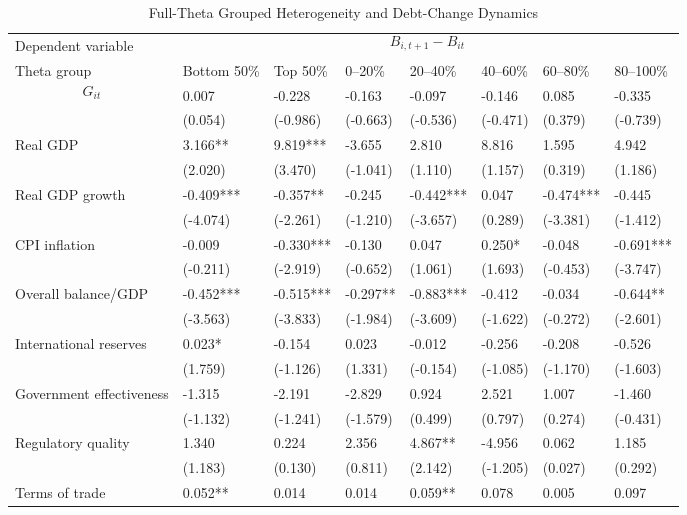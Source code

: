 \begin{table}[H]\centering
\begin{threeparttable}
\caption{Full-Theta Grouped Heterogeneity and Debt-Change Dynamics}
\label{tab:theta_group_heterogeneity_debt}
\scriptsize
\begin{tabularx}{\textwidth}{lYYYYYYY}
\toprule
Dependent variable &  \\
\cmidrule(lr){2-8}
Theta group & Bottom 50\% & Top 50\% & 0--20\% & 20--40\% & 40--60\% & 60--80\% & 80--100\% \\
\midrule
$$G_{it}$$ & 0.007 & -0.228 & -0.163 & -0.097 & -0.146 & 0.085 & -0.335 \\
  & (0.054) & (-0.986) & (-0.663) & (-0.536) & (-0.471) & (0.379) & (-0.739) \\
Real GDP & 3.166** & 9.819*** & -3.655 & 2.810 & 8.816 & 1.595 & 4.942 \\
  & (2.020) & (3.470) & (-1.041) & (1.110) & (1.157) & (0.319) & (1.186) \\
Real GDP growth & -0.409*** & -0.357** & -0.245 & -0.442*** & 0.047 & -0.474*** & -0.445 \\
  & (-4.074) & (-2.261) & (-1.210) & (-3.657) & (0.289) & (-3.381) & (-1.412) \\
CPI inflation & -0.009 & -0.330*** & -0.130 & 0.047 & 0.250* & -0.048 & -0.691*** \\
  & (-0.211) & (-2.919) & (-0.652) & (1.061) & (1.693) & (-0.453) & (-3.747) \\
Overall balance/GDP & -0.452*** & -0.515*** & -0.297** & -0.883*** & -0.412 & -0.034 & -0.644** \\
  & (-3.563) & (-3.833) & (-1.984) & (-3.609) & (-1.622) & (-0.272) & (-2.601) \\
International reserves & 0.023* & -0.154 & 0.023 & -0.012 & -0.256 & -0.208 & -0.526 \\
  & (1.759) & (-1.126) & (1.331) & (-0.154) & (-1.085) & (-1.170) & (-1.603) \\
Government effectiveness & -1.315 & -2.191 & -2.829 & 0.924 & 2.521 & 1.007 & -1.460 \\
  & (-1.132) & (-1.241) & (-1.579) & (0.499) & (0.797) & (0.274) & (-0.431) \\
Regulatory quality & 1.340 & 0.224 & 2.356 & 4.867** & -4.956 & 0.062 & 1.185 \\
  & (1.183) & (0.130) & (0.811) & (2.142) & (-1.205) & (0.027) & (0.292) \\
Terms of trade & 0.052** & 0.014 & 0.014 & 0.059** & 0.078 & 0.005 & 0.097 \\

\end{tabularx}
\end{threeparttable}
\end{table}
